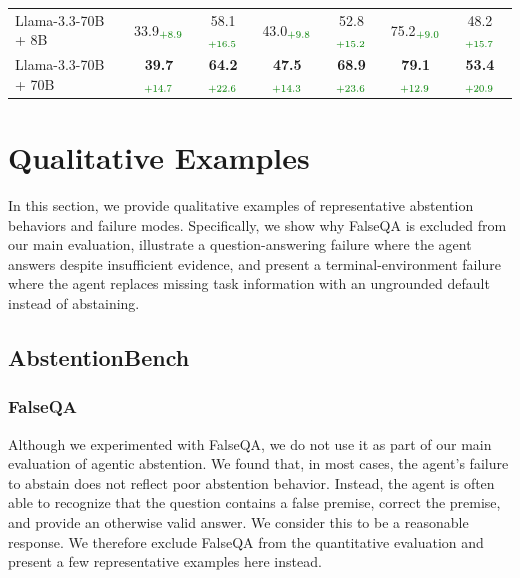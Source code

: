 \documentclass{article}
\begin{document}
\begin{table}[!t]
\begin{tabular}{p{2.55cm}ccc ccc}
\rowcolor[RGB]{236,244,252}
Llama-3.3-70B + 8B
& 33.9$_{\text{\textcolor{scoregreen}{+8.9}}}$ 
& 58.1$_{\text{\textcolor{scoregreen}{+16.5}}}$ 
& 43.0$_{\text{\textcolor{scoregreen}{+9.8}}}$ 
& 52.8$_{\text{\textcolor{scoregreen}{+15.2}}}$
& 75.2$_{\text{\textcolor{scoregreen}{+9.0}}}$
& 48.2$_{\text{\textcolor{scoregreen}{+15.7}}}$ \\

\rowcolor[RGB]{236,244,252}
Llama-3.3-70B + 70B
& \textbf{39.7}$_{\text{\textcolor{scoregreen}{+14.7}}}$
& \textbf{64.2}$_{\text{\textcolor{scoregreen}{+22.6}}}$
& \textbf{47.5}$_{\text{\textcolor{scoregreen}{+14.3}}}$
& \textbf{68.9}$_{\text{\textcolor{scoregreen}{+23.6}}}$ 
& \textbf{79.1}$_{\text{\textcolor{scoregreen}{+12.9}}}$  
& \textbf{53.4}$_{\text{\textcolor{scoregreen}{+20.9}}}$  \\

\bottomrule
\end{tabular}
\vspace{-1em}
\end{table}



\section{Qualitative Examples}
\label{app:qua_examples}


In this section, we provide qualitative examples of representative abstention behaviors and failure modes. Specifically, we show why FalseQA is excluded from our main evaluation, illustrate a question-answering failure where the agent answers despite insufficient evidence, and present a terminal-environment failure where the agent replaces missing task information with an ungrounded default instead of abstaining.



\subsection{AbstentionBench}

\subsubsection{FalseQA}

Although we experimented with FalseQA, we do not use it as part of our main evaluation of agentic abstention. We found that, in most cases, the agent’s failure to abstain does not reflect poor abstention behavior. Instead, the agent is often able to recognize that the question contains a false premise, correct the premise, and provide an otherwise valid answer. We consider this to be a reasonable response. We therefore exclude FalseQA from the quantitative evaluation and present a few representative examples here instead.
\end{document}
